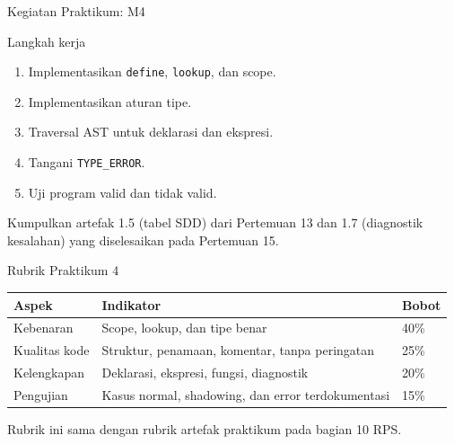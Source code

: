 \documentclass[aspectratio=169,10pt,t]{beamer}
\begin{document}
\begin{frame}{Kegiatan Praktikum: M4}
  \begin{block}{Langkah kerja}
    \footnotesize
    \begin{enumerate}
      \setlength{\itemsep}{1pt}
      \item Implementasikan \texttt{define}, \texttt{lookup}, dan
            scope.
      \item Implementasikan aturan tipe.
      \item Traversal AST untuk deklarasi dan ekspresi.
      \item Tangani \texttt{TYPE\_ERROR}.
      \item Uji program valid dan tidak valid.
    \end{enumerate}
  \end{block}

  \vspace{2pt}
  {\footnotesize\color{ubbblue!80}Kumpulkan artefak 1.5 (tabel SDD)
  dari Pertemuan 13 dan 1.7 (diagnostik kesalahan) yang diselesaikan
  pada Pertemuan 15.}
\end{frame}

\begin{frame}{Rubrik Praktikum 4}
  \small
  \setlength{\tabcolsep}{4pt}
  \begin{tabular}{@{}p{3.4cm}p{8.6cm}p{1.8cm}@{}}
    \toprule
    \textbf{Aspek} & \textbf{Indikator} & \textbf{Bobot} \\
    \midrule
    Kebenaran & Scope, lookup, dan tipe benar & 40\% \\
    Kualitas kode & Struktur, penamaan, komentar, tanpa peringatan &
      25\% \\
    Kelengkapan & Deklarasi, ekspresi, fungsi, diagnostik & 20\% \\
    Pengujian & Kasus normal, shadowing, dan error terdokumentasi &
      15\% \\
    \bottomrule
  \end{tabular}

  \vspace{5pt}
  {\footnotesize\color{ubbblue!80}Rubrik ini sama dengan rubrik artefak
  praktikum pada bagian 10 RPS.}
\end{frame}
\end{document}
